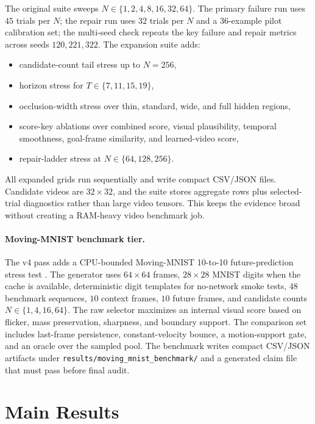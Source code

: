 \documentclass{article}
\newcommand{\nset}{\{1,2,4,8,16,32,64\}}
\DeclareRobustCommand{\resultfile}[1]{\nolinkurl{#1}}
\begin{document}
The original suite sweeps \(N \in \nset\). The primary failure run uses \(45\) trials per \(N\); the repair run uses \(32\) trials per \(N\) and a \(36\)-example pilot calibration set; the multi-seed check repeats the key failure and repair metrics across seeds \(120,221,322\). The expansion suite adds:
\begin{itemize}
  \item candidate-count tail stress up to \(N=256\),
  \item horizon stress for \(T\in\{7,11,15,19\}\),
  \item occlusion-width stress over thin, standard, wide, and full hidden regions,
  \item score-key ablations over combined score, visual plausibility, temporal smoothness, goal-frame similarity, and learned-video score,
  \item repair-ladder stress at \(N\in\{64,128,256\}\).
\end{itemize}
All expanded grids run sequentially and write compact CSV/JSON files. Candidate videos are \(32 \times 32\), and the suite stores aggregate rows plus selected-trial diagnostics rather than large video tensors. This keeps the evidence broad without creating a RAM-heavy video benchmark job.

\paragraph{Moving-MNIST benchmark tier.}
The v4 pass adds a CPU-bounded Moving-MNIST 10-to-10 future-prediction stress test \citep{srivastava2015unsupervised}. The generator uses \(64\times64\) frames, \(28\times28\) MNIST digits when the cache is available, deterministic digit templates for no-network smoke tests, \(48\) benchmark sequences, \(10\) context frames, \(10\) future frames, and candidate counts \(N\in\{1,4,16,64\}\). The raw selector maximizes an internal visual score based on flicker, mass preservation, sharpness, and boundary support. The comparison set includes last-frame persistence, constant-velocity bounce, a motion-support gate, and an oracle over the sampled pool. The benchmark writes compact CSV/JSON artifacts under \resultfile{results/moving_mnist_benchmark/} and a generated claim file that must pass before final audit.

\section{Main Results}
\end{document}
